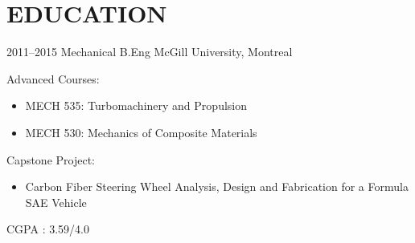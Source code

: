 
\section{EDUCATION}
%
\begin{entrylist}
\entry
{2011--2015}
{Mechanical B.Eng %
}
{McGill University, Montreal}
{%
Advanced Courses:
\begin{itemize}
\item MECH 535: Turbomachinery and Propulsion
\item MECH 530: Mechanics of Composite Materials
\end{itemize}
Capstone Project:
\begin{itemize}
\item Carbon Fiber Steering Wheel Analysis, Design and Fabrication for a Formula SAE Vehicle
\end{itemize}
CGPA : 3.59/4.0
}
\end{entrylist}
%
%
%


